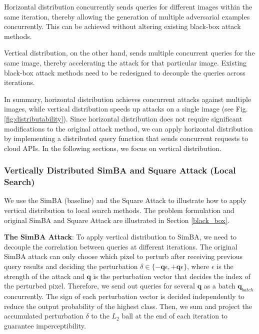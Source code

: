 Horizontal distribution concurrently sends queries for different images within the same iteration, thereby allowing the generation of multiple adversarial examples concurrently. This can be achieved without altering existing black-box attack methods. 

Vertical distribution, on the other hand, sends multiple concurrent queries for the same image, thereby accelerating the attack for that particular image. Existing black-box attack methods need to be redesigned to decouple the queries across iterations.

In summary, horizontal distribution achieves concurrent attacks against multiple images, while vertical distribution speeds up attacks on a single image (see Fig. \ref{fig:distributability}). Since horizontal distribution does not require significant modifications to the original attack method, we can apply horizontal distribution by implementing a distributed query function that sends concurrent requests to cloud APIs. In the following sections, we focus on vertical distribution.


\subsubsection{Vertically Distributed SimBA and Square Attack (Local Search)}

We use the SimBA (baseline) \cite{guo2019simple} and the Square Attack \cite{andriushchenko2020square} to illustrate how to apply vertical distribution to local search methods. The problem formulation and original SimBA and Square Attack are illustrated in Section \ref{black_box}.

\textbf{The SimBA Attack}: To apply vertical distribution to SimBA, we need to decouple the correlation between queries at different iterations. The original SimBA attack can only choose which pixel to perturb after receiving previous query results and deciding the perturbation $\delta \in \{-\boldsymbol{q}\epsilon, +\boldsymbol{q}\epsilon\}$, where $\epsilon$ is the strength of the attack and $\boldsymbol{q}$ is the perturbation vector that decides the index of the perturbed pixel. Therefore, we send out queries for several $\boldsymbol{q}$ as a batch $\boldsymbol{q}_{batch}$ concurrently. The sign of each perturbation vector is decided independently to reduce the output probability of the highest class. Then, we sum and project the accumulated perturbation $\delta$ to the $L_2$ ball at the end of each iteration to guarantee imperceptibility.

